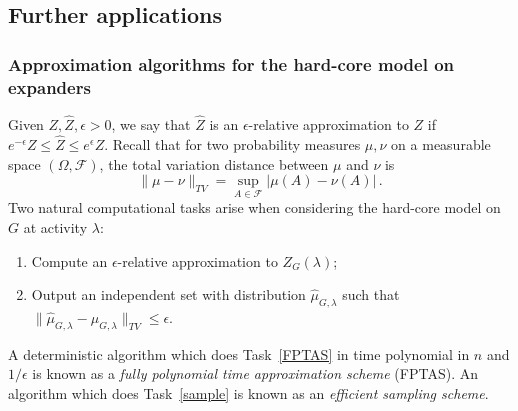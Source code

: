 \documentclass[10pt,a4paper]{amsart}
\theoremstyle{definition}
\newcommand{\eps}{\epsilon}
\newcommand{\0}[0]{\emptyset}
\newcommand{\lam}{\lambda}
\begin{document}
\subsection{Further applications}\label{subsec:furtherapp}

\subsubsection*{Approximation algorithms for the hard-core model on expanders}
Given $Z,\hat Z, \epsilon>0$, we say that $\hat Z$ is an $\epsilon$-relative approximation to $Z$ if $ e^{-\eps} Z \leq \hat Z \leq  e^{\eps} Z$. Recall that for two probability measures $\mu, \nu$ on a measurable space $(\Omega,\mathcal{F})$, the total variation distance between $\mu$ and $\nu$ is
\[
\|\mu- \nu\|_{TV}= \sup_{A\in \mathcal{F}}|\mu(A)-\nu(A)|\, .
\]
Two natural computational tasks arise when considering the hard-core model on $G$ at activity $\lam$:
\begin{enumerate}
\item  Compute an $\epsilon$-relative approximation to $Z_G(\lam)$; \label{FPTAS}
\item Output an independent set with distribution $\hat \mu_{G,\lam}$ such that $\|\hat \mu_{G,\lam}- \mu_{G,\lam}\|_{TV}\leq \eps$.\label{sample}
\end{enumerate}
A deterministic algorithm which does Task~\ref{FPTAS} in time polynomial in $n$ and $1/\eps$ is known as a \emph{fully polynomial time approximation scheme} (FPTAS).
An algorithm which does Task~\ref{sample} is known as an \emph{efficient sampling scheme}.
\end{document}
